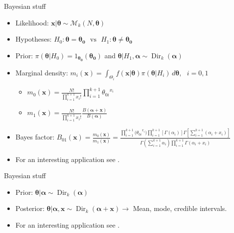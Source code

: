 \begin{frame}{Bayesian stuff}

\begin{itemize}

\item Likelihood: $\bm{x}|\bm{\theta} \sim \mathcal{M}_k(N,\bm{\theta})$

\item Hypotheses:  $ H_0: \bm{\theta}=\bm{\theta_0} \,\,\,\, \text{vs} \,\,\,\,  H_1: \bm{\theta} \neq \bm{\theta_0}$

\item Prior: $\pi(\bm{\theta}|H_0)={1_{\bm{\theta_0}}(\bm{\theta_0})}$ and $\bm{\theta}|H_1, \bm{\alpha} \sim \operatorname{Dir}_k(\bm{\alpha})$ 

\item Marginal density: $m_i(\bm{x})=\int_{\Theta_i} f(\bm{x}|\bm{\theta})\pi(\bm{\theta}|H_i) \, d\bm{\theta} $, \, $i=0,1$

\begin{itemize}

\item  $m_0(\bm{x})=\frac{N!}{\prod_{i=1}^{k+1}x_i!}\prod_{i=1}^{k+1}{\theta_{0i}}^{x_i}$ 
\item  $m_1(\bm{x})= \frac{N!}{\prod_{i=1}^{k+1}x_i!}\frac{B(\bm{\alpha}+\bm{x})}{B(\bm{\alpha})}$ 

\end{itemize}

\item Bayes factor: $B_{01}(\bm{x}) = \frac{m_0(\bm{x})}{m_1(\bm{x})} = \frac{\prod_{i=1}^{k+1}{(\theta_{0i}}^{x_i}) \prod_{i=1}^{k+1}[\Gamma(\alpha_i)] \Gamma [\sum_{i=1}^{k+1}(\alpha_i+x_i)]}{\Gamma(\sum_{i=1}^{k+1} \alpha_i) \prod_{i=1}^{k+1}\Gamma(\alpha_i+x_i)}$

\item For an interesting application see \citet{pericchiTorres2011}.

\end{itemize}

\end{frame}


\begin{frame}{Bayesian stuff}

\begin{itemize}

\item Prior: $\bm{\theta}|\bm{\alpha} \sim \operatorname{Dir}_k(\bm{\alpha})$

\item Posterior: $\bm{\theta} | \bm{\alpha}, \bm{x} \sim \operatorname{Dir}_k(\bm{\alpha} + \bm{x}) \rightarrow$ Mean, mode, credible intervals.

\item For an interesting application see \citet{ley1996peculiar}.

\end{itemize}

\end{frame}

